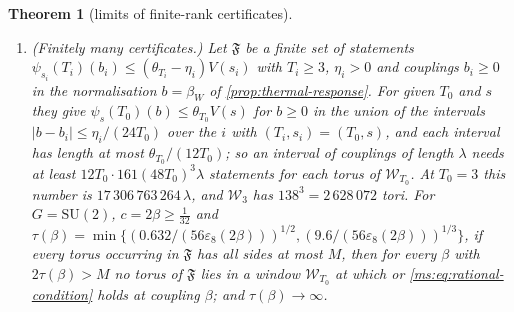 \documentclass[11pt,a4paper]{amsart}
\newtheorem{theorem}{Theorem}[section]
\theoremstyle{definition}
\theoremstyle{remark}
\numberwithin{equation}{section}
\newcommand{\Wwin}{\mathcal{W}}      %
\newcommand{\abs}[1]{\lvert #1\rvert}      %
\newcommand{\SU}{\mathrm{SU}}              %
\newcommand{\psiT}[2]{\psi_{#1}(#2)}       %
\newcommand{\Vol}[1]{V(#1)}                %
\newcommand{\Bstar}{\text{\upshape(B$^{*}$)}}       %
\newcommand{\betaW}{\beta_{W}}             %
\begin{document}
\begin{theorem}[limits of finite-rank certificates]
\begin{enumerate}[label=\textup{(\alph*)},leftmargin=*]
\item \textup{(Finitely many certificates.)} Let $\mathfrak F$ be a finite set of statements $\psiT{s_i}{T_i}(b_i)\le(\theta_{T_i}-\eta_i)\Vol{s_i}$ with $T_i\ge3$, $\eta_i>0$ and couplings $b_i\ge0$ in the normalisation $b=\betaW$ of \cref{prop:thermal-response}. For given $T_0$ and $s$ they give $\psiT{s}{T_0}(b)\le\theta_{T_0}\Vol s$ for $b\ge0$ in the union of the intervals $\abs{b-b_i}\le\eta_i/(24T_0)$ over the $i$ with $(T_i,s_i)=(T_0,s)$, and each interval has length at most $\theta_{T_0}/(12T_0)$; so an interval of couplings of length $\lambda$ needs at least $12T_0\cdot161(48T_0)^3\lambda$ statements for each torus of $\Wwin_{T_0}$. At $T_0=3$ this number is $17\,306\,763\,264\,\lambda$, and $\Wwin_3$ has $138^3=2\,628\,072$ tori. For $G=\SU(2)$, $c=2\beta\ge\frac1{32}$ and $\tau(\beta)=\min\{(0.632/(56\varepsilon_8(2\beta)))^{1/2},(9.6/(56\varepsilon_8(2\beta)))^{1/3}\}$, if every torus occurring in $\mathfrak F$ has all sides at most $M$, then for every $\beta$ with $2\tau(\beta)>M$ no torus of $\mathfrak F$ lies in a window $\Wwin_{T_0}$ at which \Bstar{} or \eqref{ms:eq:rational-condition} holds at coupling $\beta$; and $\tau(\beta)\to\infty$.
\end{enumerate}
\end{theorem}
\end{document}
